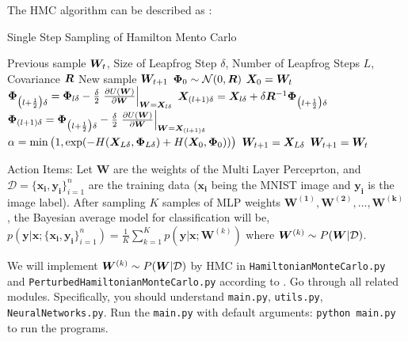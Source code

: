 The HMC algorithm can be described as :
\begin{algorithm}
\caption{Single Step Sampling of Hamilton Mento Carlo}
\label{alg:hmc}
\begin{algorithmic}
\Require Previous sample $\bm{W}_{t}$, Size of Leapfrog Step $\delta$, Number of
Leapfrog Steps $L$, Covariance $\bm{R}$
\Ensure New sample $\bm{W}_{t + 1}$
\State $\bm{\Phi}_{0} \sim \mathcal{N}(0, \bm{R})$
\State $\bm{X}_{0} = \bm{W}_{t}$
    \State $\bm{\Phi}_{\big( l + \frac{1}{2} \big) \delta} = \bm{\Phi}_{l \delta} -
    \frac{\delta}{2} \left. \frac{\partial U(\bm{W})}{\partial \bm{W}}
    \right|_{\bm{W} = \bm{X}_{l \delta}}$
    \State $\bm{X}_{(l + 1) \delta} = \bm{X}_{l \delta} + \delta \bm{R}^{-1}
    \bm{\Phi}_{\big( l + \frac{1}{2} \big) \delta}$
    \State $\bm{\Phi}_{(l + 1) \delta} = \bm{\Phi}_{\big( l +
    \frac{1}{2} \big) \delta} - \frac{\delta}{2} \left. \frac{\partial U(\bm{W})}
    {\partial \bm{W}} \right|_{\bm{W} = \bm{X}_{(l + 1) \delta}}$
\EndFor
\State $\alpha = \min\big(1, \exp(-H(\bm{X}_{L \delta}, \bm{\Phi}_{L \delta}) +
H(\bm{X}_{0}, \bm{\Phi}_{0}))\big)$
    \State $\bm{W}_{t + 1} = \bm{X}_{L \delta}$
\Else
    \State $\bm{W}_{t + 1} = \bm{W}_{t}$
\EndIf
\end{algorithmic}
\end{algorithm}
%
\hfill

%
\hfill

%
\noindent Action Items:
%
Let $\mathbf{W}$ are the weights of the Multi Layer Perceprton, and $\mathcal{D} = \{\mathbf{x_i}, \mathbf{y_i}\}_{i=1}^n$ are the training data ($\mathbf{x_i}$ being the MNIST image and $\mathbf{y_i}$ is the image label). 
After sampling $K$ samples of MLP weights $\mathbf{W^{(1)}}, \mathbf{W^{(2)}}, \ldots, \mathbf{W^{(k)}}$, the Bayesian average model for classification will be,\\
$p(\mathbf{y}|\mathbf{x}; \{\mathbf{x_i}, \mathbf{y_i}\}_{i=1}^{n}) = \frac{1}{K}\sum_{k=1}^{K}p(\mathbf{y}|\mathbf{x}; \mathbf{W}^{(k)} )$ where $ \bm{W}^{(k)} \sim P(\bm{W} | \mathcal{D})$.
    
    We will implement $\bm{W}^{(k)} \sim P(\bm{W} | \mathcal{D})$ by HMC in \texttt{HamiltonianMonteCarlo.py} and \texttt{PerturbedHamiltonianMonteCarlo.py} 
    according to .
    Go through all related modules. Specifically, you should understand \texttt{main.py}, \texttt{utils.py}, \texttt{NeuralNetworks.py}.
    Run the \texttt{main.py} with default arguments: \texttt{python main.py} to run the programs.

